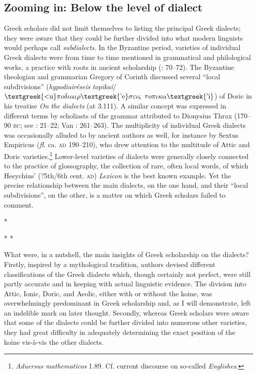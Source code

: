 \documentclass[output=paper]{langsci/langscibook}
\begin{document}
\subsection{Zooming in: Below the level of dialect}
\hypertarget{Toc19704810}{}
Greek scholars did not limit themselves to listing the principal Greek dialects; they were aware that they could be further divided into what modern linguists would perhaps call \textit{subdialects}. In the Byzantine period, varieties of individual Greek dialects were from time to time mentioned in grammatical and philological works, a practice with roots in ancient scholarship (\citealt{Hainsworth1964}: 70–72). The Byzantine theologian and grammarian Gregory of Corinth discussed several “local subdivisions” (\textit{hypodiairéseis} \textit{topikaí}/$\text{\textgreek{<u}}\pi o\delta \iota \alpha \iota \rho \text{\textgreek{'e}}\sigma \varepsilon \iota \varsigma $ $\tau o\pi \iota \kappa \alpha \text{\textgreek{'i}}$) of Doric in his treatise \textit{On} \textit{the} \textit{dialects} (at 3.111). A similar concept was expressed in different terms by scholiasts of the grammar attributed to Dionysius Thrax (170–90 \textsc{bc}; see \citealt{Lambert2009}: 21–22; Van \citealt{Rooy2016d}: 261–263). The multiplicity of individual Greek dialects was occasionally alluded to by ancient authors as well, for instance by Sextus Empiricus (\textit{fl.} ca. \textsc{ad} 190–210), who drew attention to the multitude of Attic and Doric varieties.\footnote{\textit{Aduersus} \textit{mathematicos} 1.89. Cf. current discourse on so-called \textit{Englishes}.} Lower-level varieties of dialects were generally closely connected to the practice of glossography, the collection of rare, often local words, of which Hesychius’ (?5th/6th cent. \textsc{ad}) \textit{Lexicon} is the best known example. Yet the precise relationship between the main dialects, on the one hand, and their “local subdivisions”, on the other, is a matter on which Greek scholars failed to comment.

*

*  *

What were, in a nutshell, the main insights of Greek scholarship on the dialects? Firstly, inspired by a mythological tradition, authors devised different classifications of the Greek dialects which, though certainly not perfect, were still partly accurate and in keeping with actual linguistic evidence. The division into Attic, Ionic, Doric, and Aeolic, either with or without the koine, was overwhelmingly predominant in Greek scholarship and, as I will demonstrate, left an indelible mark on later thought. Secondly, whereas Greek scholars were aware that some of the dialects could be further divided into numerous other varieties, they had great difficulty in adequately determining the exact position of the koine vis-à-vis the other dialects.
\end{document}

